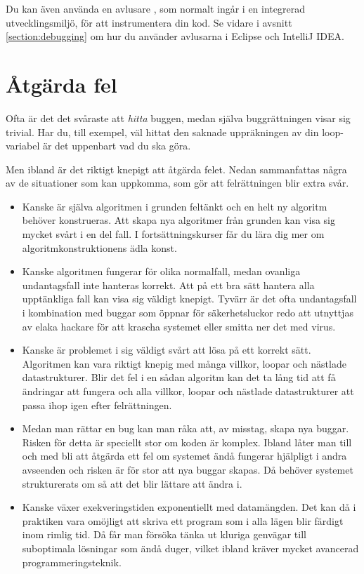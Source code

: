 \TODO

Du kan även använda en avlusare , som normalt ingår i en integrerad utvecklingsmiljö, för att instrumentera din kod. Se vidare i avsnitt \ref{section:debugging} om hur du använder avlusarna i Eclipse och IntelliJ IDEA.


\section{Åtgärda fel}

Ofta är det det svåraste att \emph{hitta} buggen, medan själva buggrättningen visar sig trivial. Har du, till exempel, väl hittat den saknade uppräkningen av din loop-variabel är det uppenbart vad du ska göra.

Men ibland är det riktigt knepigt att åtgärda felet. Nedan sammanfattas några av de situationer som kan uppkomma, som gör att felrättningen blir extra svår. 

\begin{itemize}
\item Kanske är själva algoritmen i grunden feltänkt och en helt ny algoritm behöver konstrueras. Att skapa nya algoritmer från grunden kan visa sig mycket svårt i en del fall. I fortsättningskurser får du lära dig mer om algoritmkonstruktionens ädla konst.

\item Kanske algoritmen fungerar för olika normalfall, medan ovanliga undantagsfall inte hanteras korrekt. Att på ett bra sätt hantera alla upptänkliga fall kan visa sig väldigt knepigt. Tyvärr är det ofta undantagsfall i kombination med buggar som öppnar för säkerhetsluckor redo att utnyttjas av elaka hackare för att krascha systemet eller smitta ner det med virus.

\item Kanske är problemet i sig väldigt svårt att lösa på ett korrekt sätt. Algoritmen kan vara riktigt knepig med många villkor, loopar och nästlade datastrukturer. Blir det fel i en sådan algoritm kan det ta lång tid att få ändringar att fungera och alla villkor, loopar och nästlade datastrukturer att passa ihop igen efter felrättningen. 

\item Medan man rättar en bug kan man råka att, av misstag, skapa nya buggar. Risken för detta är speciellt stor om koden är komplex. Ibland låter man till och med bli att åtgärda ett fel om systemet ändå fungerar hjälpligt i andra avseenden och risken är för stor att nya buggar skapas. Då behöver systemet strukturerats om så att det blir lättare att ändra i.

\item Kanske växer exekveringstiden exponentiellt med datamängden. Det kan då i praktiken vara omöjligt att skriva ett program som i alla lägen blir färdigt inom rimlig tid. Då får man försöka tänka ut kluriga genvägar till suboptimala lösningar som ändå duger, vilket ibland kräver mycket avancerad programmeringsteknik.
 
\end{itemize}

